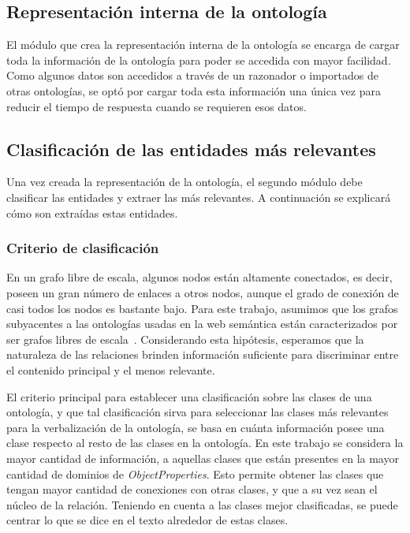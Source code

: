\subsection{Representación interna de la ontología}

El módulo que crea la representación interna de la ontología se encarga de cargar toda la información de la ontología para poder se accedida con mayor facilidad. Como algunos datos son accedidos a través de un razonador o importados de otras ontologías, se optó por cargar toda esta información una única vez para reducir el tiempo de respuesta cuando se requieren esos datos.

\subsection{Clasificación de las entidades más relevantes}
Una vez creada la representación de la ontología, el segundo módulo debe clasificar las entidades y extraer las más relevantes. A continuación se explicará cómo son extraídas estas entidades.

\subsubsection{Criterio de clasificación}
  En un grafo libre de escala, algunos nodos están altamente conectados, es decir, poseen un gran número de enlaces a otros nodos, aunque el grado de conexión de casi todos los nodos es bastante bajo. Para este trabajo, asumimos que los grafos subyacentes a las ontologías usadas en la web semántica están caracterizados por ser grafos libres de escala~\cite{zhang2008scale}.
Considerando esta hipótesis, esperamos que la naturaleza de las relaciones brinden información suficiente para discriminar entre el contenido principal y el menos relevante.

El criterio principal para establecer una clasificación sobre las clases de una ontología, y que tal clasificación sirva para seleccionar las clases más relevantes para la verbalización de la ontología, se basa en cuánta información posee una clase respecto al resto de las clases en la ontología. En este trabajo se considera la mayor cantidad de información, a aquellas clases que están presentes en la mayor cantidad de dominios de \emph{ObjectProperties}. Esto permite obtener las clases que tengan mayor cantidad de conexiones con otras clases, y que a su vez sean el núcleo de la relación. Teniendo en cuenta a las clases mejor clasificadas, se puede centrar lo que se dice en el texto alrededor de estas clases.

